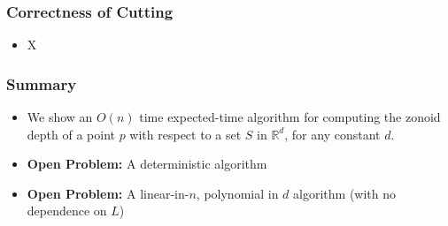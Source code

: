 \documentclass{beamer}
\begin{document}
\frame
{
   \frametitle{Correctness of Cutting}
   \begin{itemize}
     \item X
   \end{itemize}

}

\frame
{
   \frametitle{Summary}
   \begin{itemize}

     \item We show an $O(n)$ time expected-time algorithm for
computing the zonoid depth of a point $p$ with respect to a set $S$ in
$\mathbb{R}^d$, for any constant $d$.

     \item \textbf{Open Problem:} A deterministic algorithm
     \item \textbf{Open Problem:} A linear-in-$n$, polynomial in $d$
         algorithm (with no dependence on $L$)
   \end{itemize}
}
\end{document}
